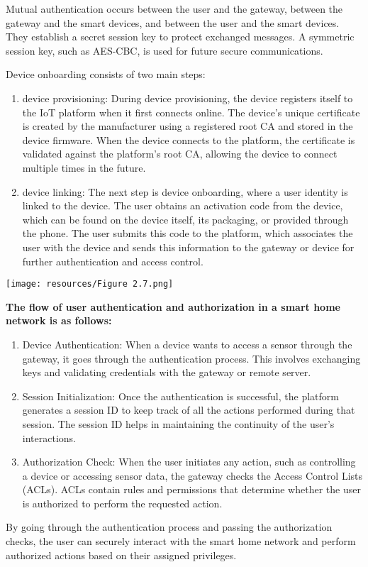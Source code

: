 Mutual authentication occurs between the user and the gateway, between the gateway and the smart devices, and between the user and the smart devices. They establish a secret session key to protect exchanged messages. A symmetric session key, such as AES-CBC, is used for future secure communications.


Device onboarding consists of two main steps:

\begin{enumerate}
    \item device provisioning: During device provisioning, the device registers itself to the IoT platform when it first connects online. The device's unique certificate is created by the manufacturer using a registered root CA and stored in the device firmware. When the device connects to the platform, the certificate is validated against the platform's root CA, allowing the device to connect multiple times in the future.
    \item device linking: The next step is device onboarding, where a user identity is linked to the device. The user obtains an activation code from the device, which can be found on the device itself, its packaging, or provided through the phone. The user submits this code to the platform, which associates the user with the device and sends this information to the gateway or device for further authentication and access control.
\end{enumerate}

\texttt{[image: resources/Figure 2.7.png]}

\textbf{The flow of user authentication and authorization in a smart home network is as follows:}
\begin{enumerate}
    \item Device Authentication: When a device wants to access a sensor through the gateway, it goes through the authentication process. This involves exchanging keys and validating credentials with the gateway or remote server.
    \item Session Initialization: Once the authentication is successful, the platform generates a session ID to keep track of all the actions performed during that session. The session ID helps in maintaining the continuity of the user's interactions.
    \item Authorization Check: When the user initiates any action, such as controlling a device or accessing sensor data, the gateway checks the Access Control Lists (ACLs). ACLs contain rules and permissions that determine whether the user is authorized to perform the requested action.
\end{enumerate}
By going through the authentication process and passing the authorization checks, the user can securely interact with the smart home network and perform authorized actions based on their assigned privileges.


